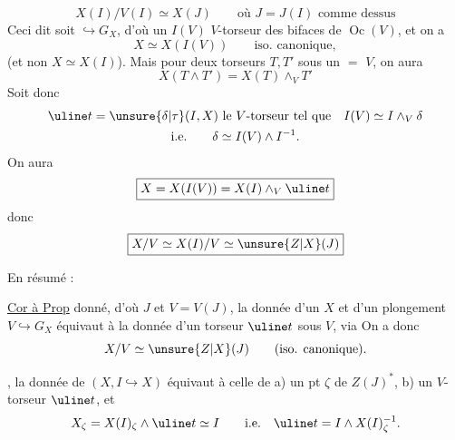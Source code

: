 \[
X(I)/V(I)\simeq X(J)\qquad\text{où }J=J(I)\text{ comme dessus}
\]
Ceci dit soit 
$\hookrightarrow G_X$, d'où un $I(V)$ $V$-torseur
des bifaces de $\operatorname{Oc}(V)$, et on a 
\[
X\simeq X(I(V))\qquad\text{iso. canonique},
\]
(et non $X\simeq X(I)$). Mais pour  deux torseurs
$T,T'$ sous un $=$ $V$, on aura
\[
X(T\wedge T')=X(T)\wedge_V T'
\]
Soit donc
\[
\begin{gathered}
\uline t=\unsure{\delta|\tau}(I,X)\text{ le }V\text{-torseur tel que}\quad I(V)\simeq I\wedge_V\delta\\
\text{i.e.}\qquad\delta\simeq I(V)\wedge I^{-1}.
\end{gathered}
\]
On aura
\[
\boxed{X=X(I(V))=X(I)\wedge_V\uline t}
\]
 donc
\[
\boxed{X/V\simeq X(I)/V\simeq\unsure{Z|X}(J)}
\]

En résumé :

\uline{Cor à Prop} 
donné, d'où $J$ et
$V=V(J)$, la donnée d'un $X$ et d'un plongement
$V\hookrightarrow G_X$ équivaut à la donnée d'un torseur $\uline t$ sous $V$,
via
On a donc
\[
X/V\simeq\unsure{Z|X}(J)\qquad\text{(iso. canonique)}.
\]

\uline{},  la donnée de $(X,I\hookrightarrow X)$ équivaut à
celle de a) un pt $\zeta$ de $Z(J)^*$, b) un $V$-torseur $\uline t$,
et
\[
X_\zeta=X(I)_\zeta\wedge\uline t\simeq I\qquad\text{i.e.}\quad\uline t=I\wedge X(I)_\zeta^{-1}.
\]

